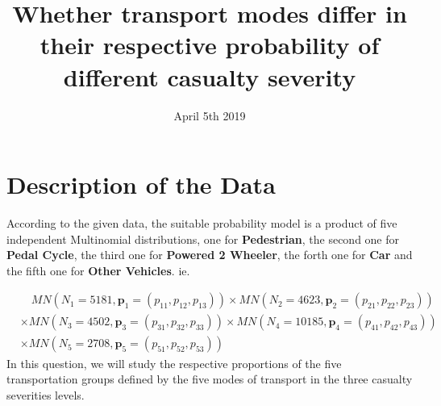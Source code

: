 \documentclass[12pt]{article}
\title{Whether transport modes differ in their respective probability of different casualty severity}
\date{April 5th 2019}
\begin{document}
\maketitle

\newpage
\tableofcontents
\newpage


















\section{Description of the Data}
According to the given data, the suitable probability model is a product of five independent Multinomial distributions, one for \textbf{Pedestrian}, the second one for \textbf{Pedal Cycle}, the third one for \textbf{Powered 2 Wheeler}, the forth one for \textbf{Car} and the fifth one for \textbf{Other Vehicles}. ie.

\begin{equation}
\begin{split}
&\quad MN(N_1 = 5181, \textbf{p}_1 = (p_{11},p_{12},p_{13}))\times MN(N_2 = 4623, \textbf{p}_2 = (p_{21},p_{22},p_{23}))\\
&\times MN(N_3 = 4502, \textbf{p}_3 = (p_{31},p_{32},p_{33}))\times MN(N_4 = 10185, \textbf{p}_4 = (p_{41},p_{42},p_{43}))\\
&\times MN(N_5 = 2708, \textbf{p}_5 = (p_{51},p_{52},p_{53}))
\end{split}
\end{equation}
In this question, we will study the respective proportions of the five transportation groups defined by the five modes of transport in the three casualty severities levels.



\end{document}
